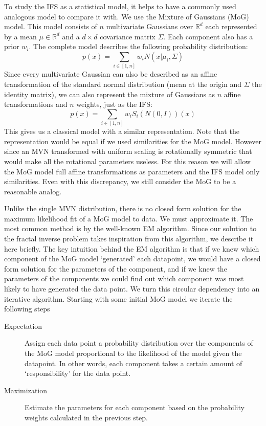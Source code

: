 \documentclass[10pt,a4paper,oneside]{article}
\theoremstyle{definition}
\begin{document}
To study the IFS as a statistical model, it helps to have a commonly used analogous model to compare it with. We use the Mixture of Gaussians (MoG) model. This model consists of $n$ multivariate Gaussians over ${\mathbb R}^d$ each represented by a mean $\mu \in {\mathbb R}^d$ and a $d \times d$ covariance matrix $\Sigma$. Each component also has a prior $w_i$. The complete model describes the following probability distribution:
\[
p(x) = \sum_{i \in [1,n]} w_i N(x|\mu_i, \Sigma)
\]
Since every multivariate Gaussian can also be described as an affine transformation of the standard normal distribution (mean at the origin and $\Sigma$ the identity matrix), we can also represent the mixture of Gaussians as $n$ affine transformations and $n$ weights, just as the IFS:
\[
p(x) = \sum_{i \in [1,n]} w_i S_i(N(0, I))(x)
\]
This gives us a classical model with a similar representation. Note that the representation would be equal if we used similarities for the MoG model. However since an MVN transformed with uniform scaling is rotationally symmetric that would make all the rotational parameters useless. For this reason we will allow the MoG model full affine transformations as parameters and the IFS model only similarities. Even with this discrepancy, we still consider the MoG to be a reasonable analog.

Unlike the single MVN distribution, there is no closed form solution for the maximum likelihood fit of a MoG model to data. We must approximate it. The most common method is by the well-known EM algorithm. Since our solution to the fractal inverse problem takes inspiration from this algorithm, we describe it here briefly. The key intuition behind the EM algorithm is that if we knew which component of the MoG model `generated' each datapoint, we would have a closed form solution for the parameters of the component, and if we knew the parameters of the components we could find out which component was most likely to have generated the data point. We turn this circular dependency into an iterative algorithm. Starting with some initial MoG model we iterate the following steps

\begin{description}
  \item[Expectation] Assign each data point a probability distribution over the components of the MoG model proportional to the likelihood of the model given the datapoint. In other words, each component takes a certain amount of `responsibility' for the data point.
  \item[Maximization] Estimate the parameters for each component based on the probability weights calculated in the previous step.
\end{description} 
\end{document}
